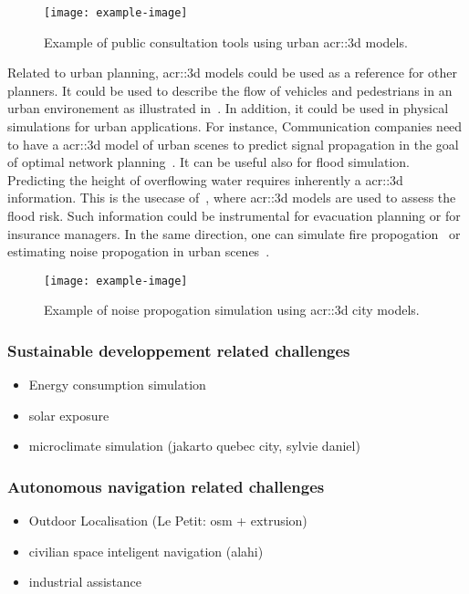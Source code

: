         \begin{figure}[h]
            \centering
            \texttt{[image: example-image]}             
            \caption{
                \label{fig::public_consultation} Example of public consultation tools using urban \gls{acr::3d} models.
            }
        \end{figure}
        Related to urban planning, \gls{acr::3d} models could be used as a reference for other planners.
        It could be used to describe the flow of vehicles and pedestrians in an urban environement as illustrated in~\textcite{Vanhoey:2017:VVS:3084363.3085085}.
        In addition, it could be used in physical simulations for urban applications.
        For instance, Communication companies need to have a \gls{acr::3d} model of urban scenes to predict signal propagation in the goal of optimal network planning~\parencite{yun2007radio}.
        It can be useful also for flood simulation.
        Predicting the height of overflowing water requires inherently a \gls{acr::3d} information.
        This is the usecase of~\textcite{varduhn2015multi}, where \gls{acr::3d} models are used to assess the flood risk.
        Such information could be instrumental for evacuation planning or for insurance managers.
        In the same direction, one can simulate fire propogation~\parencite{dimitropoulos2010fire} or estimating noise propogation in urban scenes~\parencite{stoter20083d}.
        \begin{figure}[h]
            \centering
            \texttt{[image: example-image]}             
            \caption{
                \label{fig::public_consultation} Example of noise propogation simulation using \gls{acr::3d} city models.
            }
        \end{figure}
        \subsubsection{Sustainable developpement related challenges}
        \begin{itemize}
            \item Energy consumption simulation
            \item solar exposure
            \item microclimate simulation (jakarto quebec city, sylvie daniel)
        \end{itemize}
        \subsubsection{Autonomous navigation related challenges}
        \begin{itemize}
            \item Outdoor Localisation (Le Petit: osm + extrusion)
            \item civilian space inteligent navigation (alahi)
            \item industrial assistance
        \end{itemize}
